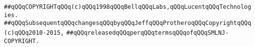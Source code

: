 \newline
\newline
\verb|##qQQqCOPYRIGHTqQQq(c)qQQq1998qQQqBellqQQqLabs,qQQqLucentqQQqTechnologies.|\newline
\verb|##qQQqSubsequentqQQqchangesqQQqbyqQQqJeffqQQqProtheroqQQqCopyrightqQQq(c)qQQq2010-2015,|\newline
\verb|##qQQqreleasedqQQqperqQQqtermsqQQqofqQQqSMLNJ-COPYRIGHT.|\newline

